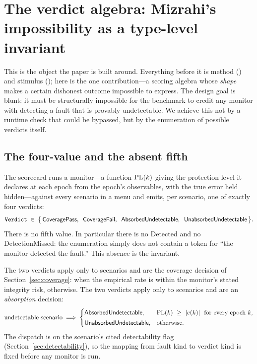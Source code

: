 \section{The verdict algebra: Mizrahi's impossibility as a type-level invariant}
\label{sec:verdict}

This is the object the paper is built around. Everything before it is method
(\Cited{}) and stimulus (\Modelled{}); here is the one \Proven{} contribution---a
scoring algebra whose \emph{shape} makes a certain dishonest outcome impossible to
express. The design goal is blunt: it must be structurally impossible for the
benchmark to credit any monitor with detecting a fault that is provably
undetectable. We achieve this not by a runtime check that could be bypassed, but by
the enumeration of possible verdicts itself.

\subsection{The four-value  and the absent fifth}
\label{sec:verdictenum}

The scorecard runs a monitor---a function $\mathrm{PL}(k)$ giving the protection level it
declares at each epoch from the epoch's observables, with the true error held
hidden---against every scenario in a menu and emits, per scenario, one of exactly
four verdicts:
\begin{equation}
  \texttt{Verdict} \;\in\; \big\{\,
  \textsf{CoveragePass}{},\;\;
  \textsf{CoverageFail}{},\;\;
  \textsf{AbsorbedUndetectable}{},\;\;
  \textsf{UnabsorbedUndetectable}{}
  \,\big\}.
  \label{eq:verdict}
\end{equation}
There is no fifth value. In particular there is no \textsf{Detected} and no
\textsf{DetectionMissed}: the enumeration simply does not contain a token for
``the monitor detected the fault.'' This absence is the invariant.

The two  verdicts apply only to  scenarios and are
the coverage decision of Section~\ref{sec:coverage}: \CovPass{} when the empirical
\HMI{} rate is within the monitor's stated integrity risk, \CovFail{} otherwise.
The two  verdicts apply only to  scenarios
and are an \emph{absorption} decision:
\begin{equation}
  \text{undetectable scenario} \;\Longrightarrow\;
  \begin{cases}
    \textsf{AbsorbedUndetectable}{}, & \mathrm{PL}(k)\ \ge\ |e(k)| \ \ \text{for every epoch } k,\\[2pt]
    \textsf{UnabsorbedUndetectable}{}, & \text{otherwise.}
  \end{cases}
  \label{eq:absorb}
\end{equation}
The dispatch is on the scenario's cited detectability flag
(Section~\ref{sec:detectability}), so the mapping from fault kind to verdict kind
is fixed before any monitor is run.

